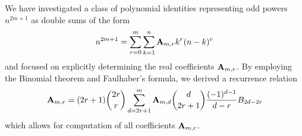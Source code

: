 We have investigated a class of polynomial identities representing odd powers $n^{2m+1}$ as double sums of the form
\begin{align*}
    n^{2m+1} = \sum_{r=0}^{m} \sum_{k=1}^{n} {\mathbf{A}} \sb{m,r} k^r (n-k)^r
\end{align*}
and focused on explicitly determining the real coefficients ${\mathbf{A}} \sb{m,r}$.
By employing the Binomial theorem and Faulhaber’s formula, we derived a recurrence relation
\begin{align*}
    {\mathbf{A}} \sb{m,r}
    = (2r+1) \binom{2r}{r} \sum_{d = 2r+1}^{m} {\mathbf{A}} \sb{m,d} \binom{d}{2r+1} \frac{(-1)^{d-1}}{d-r} {B}\sb{2d-2r}
\end{align*}
which allows for computation of all coefficients ${\mathbf{A}} \sb{m,r}$.
